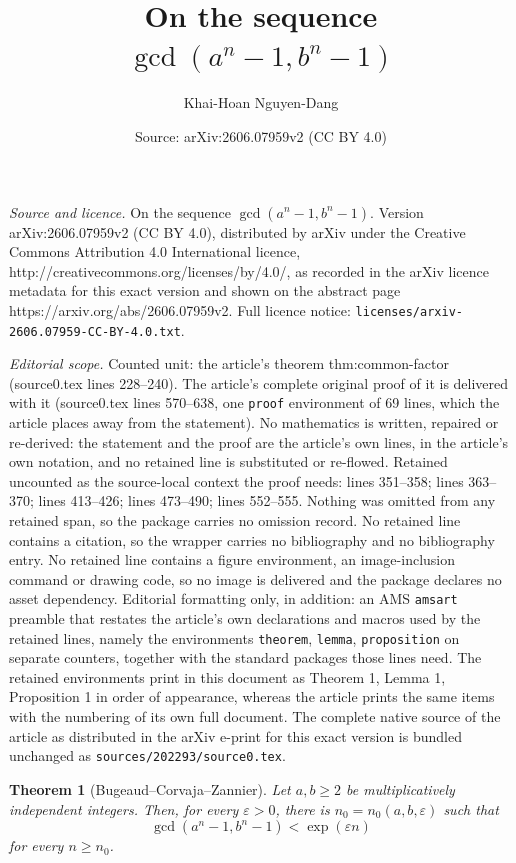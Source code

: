 \documentclass[10pt,a4paper]{amsart}
\title{On the sequence $\gcd(a^n-1,b^n-1)$}
\author{Khai-Hoan Nguyen-Dang}
\date{Source: arXiv:2606.07959v2 (CC BY 4.0)}
\newtheorem{theorem}{Theorem}
\begin{document}
\maketitle

\noindent\emph{Source and licence.} On the sequence $\gcd(a^n-1,b^n-1)$. Version arXiv:2606.07959v2 (CC BY 4.0), distributed by arXiv under the Creative Commons Attribution 4.0 International licence, http://creativecommons.org/licenses/by/4.0/, as recorded in the arXiv licence metadata for this exact version and shown on the abstract page https://arxiv.org/abs/2606.07959v2. Full licence notice: \texttt{licenses/arxiv-2606.07959-CC-BY-4.0.txt}.\par\smallskip

\noindent\textit{Editorial scope.} Counted unit: the article's theorem thm:common-factor (source0.tex lines 228--240). The article's complete original proof of it is delivered with it (source0.tex lines 570--638, one \texttt{proof} environment of 69 lines, which the article places away from the statement). No mathematics is written, repaired or re-derived: the statement and the proof are the article's own lines, in the article's own notation, and no retained line is substituted or re-flowed.  Retained uncounted as the source-local context the proof needs: lines 351--358; lines 363--370; lines 413--426; lines 473--490; lines 552--555.  Nothing was omitted from any retained span, so the package carries no omission record.  No retained line contains a citation, so the wrapper carries no bibliography and no bibliography entry.  No retained line contains a figure environment, an image-inclusion command or drawing code, so no image is delivered and the package declares no asset dependency.  Editorial formatting only, in addition: an AMS \texttt{amsart} preamble that restates the article's own declarations and macros used by the retained lines, namely the environments \texttt{theorem}, \texttt{lemma}, \texttt{proposition} on separate counters, together with the standard packages those lines need.  The retained environments print in this document as Theorem 1, Lemma 1, Proposition 1 in order of appearance, whereas the article prints the same items with the numbering of its own full document.  The complete native source of the article as distributed in the arXiv e-print for this exact version is bundled unchanged as \texttt{sources/202293/source0.tex}.
\begin{theorem}[Bugeaud--Corvaja--Zannier]\label{thm:BCZ}
Let $a,b\ge 2$ be multiplicatively independent integers.  Then, for every
$\varepsilon>0$, there is $n_0=n_0(a,b,\varepsilon)$ such that
\[
  \gcd(a^n-1,b^n-1)<\exp(\varepsilon n)
\]
for every $n\ge n_0$.
\end{theorem}
\end{document}
